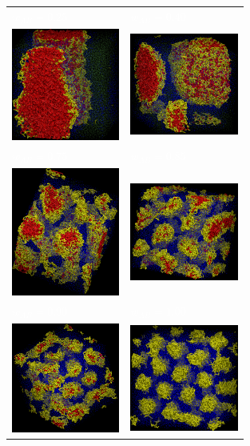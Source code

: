 \documentclass[
aip,
jcp,
reprint,
]{revtex4-1}
\begin{document}
\begin{figure}
	\centering
	\begin{tabular}{C{1.6in}@{}C{1.6in}}
		 \textcolor{white}{$w_{AB}=0.25$} & \textcolor{white}{$w_{AB}=0.40$} \\
		 \includegraphics[width=1.4in]{A3B7_025} & \includegraphics[width=1.4in]{A3B7_040} \\
		 \textcolor{white}{$w_{AB}=0.75$} & \textcolor{white}{$w_{AB}=0.85$} \\
		 \includegraphics[width=1.4in]{A3B7_075} & \includegraphics[width=1.4in]{A3B7_085} \\		
		 \textcolor{white}{$w_{AB}=0.90$} & \textcolor{white}{$w_{AB}=1.00$} \\
		 \includegraphics[width=1.4in]{A3B7_090} & \includegraphics[width=1.4in]{A3B7_100} \\		

\end{tabular}
\end{figure}
\end{document}

